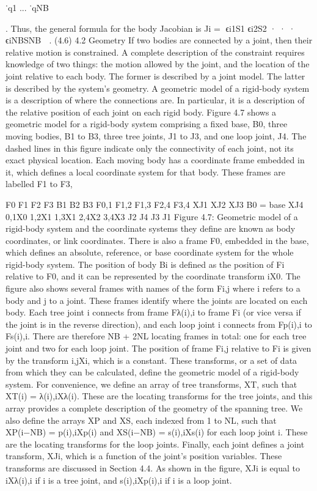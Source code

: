 ˙q1 ... ˙qNB

. Thus, the general formula for the body Jacobian is Ji = ϵi1S1 ϵi2S2 · · · ϵiNBSNB  . (4.6) 4.2 Geometry If two bodies are connected by a joint, then their relative motion is constrained. A complete description of the constraint requires knowledge of two things: the motion allowed by the joint, and the location of the joint relative to each body. The former is described by a joint model. The latter is described by the system’s geometry. A geometric model of a rigid-body system is a description of where the connections are. In particular, it is a description of the relative position of each joint on each rigid body. Figure 4.7 shows a geometric model for a rigid-body system comprising a fixed base, B0, three moving bodies, B1 to B3, three tree joints, J1 to J3, and one loop joint, J4. The dashed lines in this figure indicate only the connectivity of each joint, not its exact physical location. Each moving body has a coordinate frame embedded in it, which defines a local coordinate system for that body. These frames are labelled F1 to F3,

F0 F1 F2 F3 B1 B2 B3 F0,1 F1,2 F1,3 F2,4 F3,4 XJ1 XJ2 XJ3 B0 = base XJ4 0,1X0 1,2X1 1,3X1 2,4X2 3,4X3 J2 J4 J3 J1 Figure 4.7: Geometric model of a rigid-body system and the coordinate systems they define are known as body coordinates, or link coordinates. There is also a frame F0, embedded in the base, which defines an absolute, reference, or base coordinate system for the whole rigid-body system. The position of body Bi is defined as the position of Fi relative to F0, and it can be represented by the coordinate transform iX0. The figure also shows several frames with names of the form Fi,j where i refers to a body and j to a joint. These frames identify where the joints are located on each body. Each tree joint i connects from frame Fλ(i),i to frame Fi (or vice versa if the joint is in the reverse direction), and each loop joint i connects from Fp(i),i to Fs(i),i. There are therefore NB + 2NL locating frames in total: one for each tree joint and two for each loop joint. The position of frame Fi,j relative to Fi is given by the transform i,jXi, which is a constant. These transforms, or a set of data from which they can be calculated, define the geometric model of a rigid-body system. For convenience, we define an array of tree transforms, XT, such that XT(i) = λ(i),iXλ(i). These are the locating transforms for the tree joints, and this array provides a complete description of the geometry of the spanning tree. We also define the arrays XP and XS, each indexed from 1 to NL, such that XP(i−NB) = p(i),iXp(i) and XS(i−NB) = s(i),iXs(i) for each loop joint i. These are the locating transforms for the loop joints. Finally, each joint defines a joint transform, XJi, which is a function of the joint’s position variables. These transforms are discussed in Section 4.4. As shown in the figure, XJi is equal to iXλ(i),i if i is a tree joint, and s(i),iXp(i),i if i is a loop joint.

